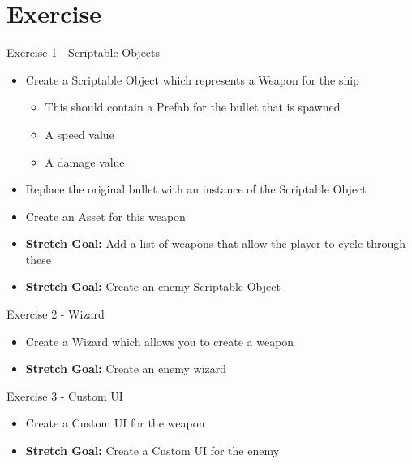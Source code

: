 \part{Exercise}
\frame{\partpage}

\begin{frame}{Exercise 1 - Scriptable Objects}
	\begin{itemize}
		\item Create a Scriptable Object which represents a Weapon for the ship
		\begin{itemize}
			\item This should contain a Prefab for the bullet that is spawned
			\item A speed value
			\item A damage value
		\end{itemize}
		\item Replace the original bullet with an instance of the Scriptable Object
		\item Create an Asset for this weapon
		\item \textbf{Stretch Goal:} Add a list of weapons that allow the player to cycle through these
		\item \textbf{Stretch Goal:} Create an enemy Scriptable Object
	\end{itemize}
\end{frame}

\begin{frame}{Exercise 2 - Wizard}
\begin{itemize}
	\item Create a Wizard which allows you to create a weapon
	\item \textbf{Stretch Goal:} Create an enemy wizard
\end{itemize}
\end{frame}

\begin{frame}{Exercise 3 - Custom UI}
\begin{itemize}
	\item Create a Custom UI for the weapon
	\item \textbf{Stretch Goal:} Create a Custom UI for the enemy
\end{itemize}
\end{frame}